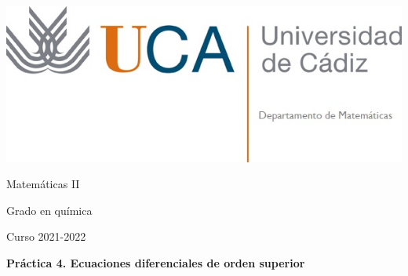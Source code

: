 \documentclass{article}
\title{}
\author{}
\date{}
\begin{document}
\begin{minipage}{.4\textwidth}
	\includegraphics[width=\linewidth]{uca.jpg}
\end{minipage}
%
\begin{minipage}{.6\textwidth}
	\begin{flushright}
		{\Large Matemáticas II}

		\medskip
		{\large Grado en química}

		\medskip
		Curso 2021-2022
	\end{flushright}
\end{minipage}

\medskip
\textbf{\Large Práctica 4. Ecuaciones diferenciales de orden superior}


\end{document}
